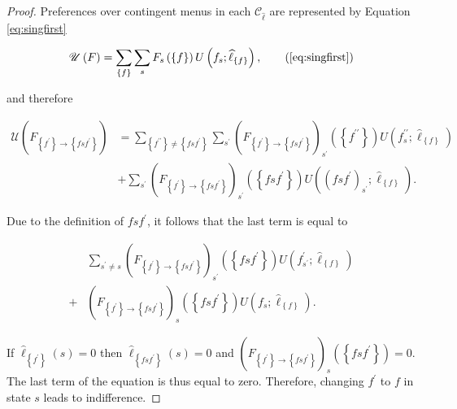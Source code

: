 \begin{proof}
	Preferences over contingent menus in each \( \mathcal{C}_{\widehat{\ell}} \) are represented by Equation \eqref{eq:singfirst}

	\begin{equation}
		\mathscr{U} \left( F \right) = \sum_{\left\{ f \right\}} \sum_s F_s \left( \left\{ f \right\} \right) U \left( f_s ; \widehat{\ell}_{\left\{ f \right\}} \right) , \tag{\ref{eq:singfirst}}
	\end{equation}

	and therefore

	\begin{align*}
		\mathscr{U} \left( F_{ \left\{ f^{\prime} \right\} \rightarrow \left\{ f s f^{\prime} \right\}} \right) & = \sum_{\left\{ f^{\prime \prime} \right\} \neq \left\{ f s f^{\prime} \right\}} \sum_{s^{\prime}} \left( F_{ \left\{ f^{\prime} \right\} \rightarrow \left\{ f s f^{\prime} \right\}} \right)_{s^{\prime}} \left( \left\{ f^{\prime \prime} \right\} \right) U \left( f^{\prime \prime}_s ; \widehat{\ell}_{\left\{ f \right\}} \right) \\
		                                                                                                        & + \sum_{s^{\prime}} \left( F_{ \left\{ f^{\prime} \right\} \rightarrow \left\{ f s f^{\prime} \right\}} \right)_{s^{\prime}} \left( \left\{ f s f^{\prime} \right\} \right) U \left( \left( f s f^{\prime} \right)_{s^{\prime}} ; \widehat{\ell}_{\left\{ f \right\}} \right).
	\end{align*}

	Due to the definition of \( f s f^{\prime} \), it follows that the last term is equal to

	\begin{align*}
		  & \sum_{s^{\prime} \neq s} \left( F_{ \left\{ f^{\prime} \right\} \rightarrow \left\{ f s f^{\prime} \right\}} \right)_{s^{\prime}} \left( \left\{ f s f^{\prime} \right\} \right) U \left( f^{\prime}_{s^{\prime}} ; \widehat{\ell}_{\left\{ f \right\}} \right) \\
		+ & \left( F_{ \left\{ f^{\prime} \right\} \rightarrow \left\{ f s f^{\prime} \right\}} \right)_{s} \left( \left\{ f s f^{\prime} \right\} \right) U \left( f_s ; \widehat{\ell}_{\left\{ f \right\}} \right).
	\end{align*}

	If \( \widehat{\ell}_{\left\{ f^{\prime} \right\}} \left( s \right) = 0 \) then \( \widehat{\ell}_{\left\{ f s f^{\prime} \right\}} \left( s \right) = 0 \) and \(\left( F_{ \left\{ f^{\prime} \right\} \rightarrow \left\{ f s f^{\prime} \right\}} \right)_{s} \left( \left\{ f s f^{\prime} \right\} \right) = 0 \). The last term of the equation is thus equal to zero. Therefore, changing \( f^{\prime} \) to \( f \) in state \( s \) leads to indifference.
\end{proof}

